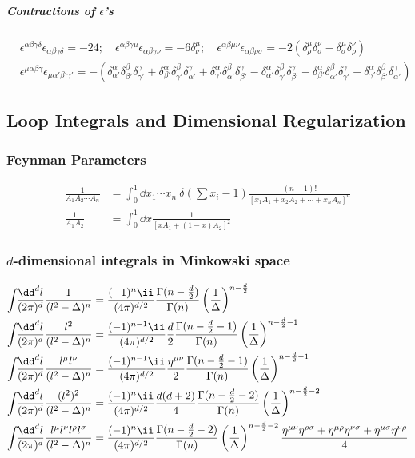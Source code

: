 \subparagraph{Contractions of $\epsilon$'s}
\begin{align}
& \epsilon^{\alpha\beta\gamma\delta}\epsilon_{\alpha\beta\gamma\delta}=-24;\quad
 \epsilon^{\alpha\beta\gamma\mu}\epsilon_{\alpha\beta\gamma\nu}=-6\delta^\mu_\nu;\quad
 \epsilon^{\alpha\beta\mu\nu}\epsilon_{\alpha\beta\rho\sigma}=-2(
\delta^\mu_\rho\delta^\nu_\sigma-\delta^\mu_\sigma\delta^\nu_\rho
)\\
&\epsilon^{\mu\alpha\beta\gamma}\epsilon_{\mu\alpha'\beta'\gamma'}=-
\left
(\delta^\alpha_{\alpha'}\delta^\beta_{\beta'}\delta^\gamma_{\gamma'}
+\delta^\alpha_{\beta'}\delta^\beta_{\gamma'}\delta^\gamma_{\alpha'}
+\delta^\alpha_{\gamma'}\delta^\beta_{\alpha'}\delta^\gamma_{\beta'}
-\delta^\alpha_{\alpha'}\delta^\beta_{\gamma'}\delta^\gamma_{\beta'}
-\delta^\alpha_{\beta'}\delta^\beta_{\alpha'}\delta^\gamma_{\gamma'}
-\delta^\alpha_{\gamma'}\delta^\beta_{\beta'}\delta^\gamma_{\alpha'}
\right)
\end{align}


\newpage

\subsection{Loop Integrals and Dimensional Regularization}
\subsubsection{Feynman Parameters}\vspace{-2.5zw}
\begin{align}
 \frac{1}{A_1A_2\cdots A_n}&=
\int_0^1\dd x_1\cdots x_n\ \delta\left(\sum x_i-1\right)
\frac{(n-1)!}{[x_1A_1+x_2A_2+\cdots+x_nA_n]^n}\\
 \frac{1}{A_1A_2}&=
\int_0^1\dd x\frac{1}{[xA_1+(1-x)A_2]^2}
\end{align}
\subsubsection{$d$-dimensional integrals in Minkowski space}\vspace{-2.5zw}
\begin{align}
 \intdP[d]{l}\frac1{(l^2-\Delta)^n}&=
\frac{(-1)^n\ii}{(4\pi)^{d/2}}\frac{\Gamma(n-\frac d2)}{\Gamma(n)}
\left(\frac1\Delta\right)^{n-\frac d2}
\\
 \intdP[d]{l}\frac{l^2}{(l^2-\Delta)^n}&=
\frac{(-1)^{n-1}\ii}{(4\pi)^{d/2}}\frac d2\frac{\Gamma(n-\frac d2-1)}{\Gamma(n)}
\left(\frac1\Delta\right)^{n-\frac d2-1}
\\
 \intdP[d]{l}\frac{l^\mu l^\nu}{(l^2-\Delta)^n}&=
\frac{(-1)^{n-1}\ii}{(4\pi)^{d/2}}\frac {\Hmn}2\frac{\Gamma(n-\frac d2-1)}{\Gamma(n)}
\left(\frac1\Delta\right)^{n-\frac d2-1}
\\
 \intdP[d]{l}\frac{(l^2)^2}{(l^2-\Delta)^n}&=
\frac{(-1)^n\ii}{(4\pi)^{d/2}}\frac{d(d+2)}4\frac{\Gamma(n-\frac d2-2)}{\Gamma(n)}
\left(\frac1\Delta\right)^{n-\frac d2-2}
\\
 \intdP[d]{l}\frac{l^\mu l^\nu l^\rho l^\sigma}{(l^2-\Delta)^n}&=
\frac{(-1)^n\ii}{(4\pi)^{d/2}}\frac{\Gamma(n-\frac d2-2)}{\Gamma(n)}
\left(\frac1\Delta\right)^{n-\frac d2-2}
\frac{\Hmn\Hrs+\Hmr\Hns+\Hms\Hnr}4
\end{align}

